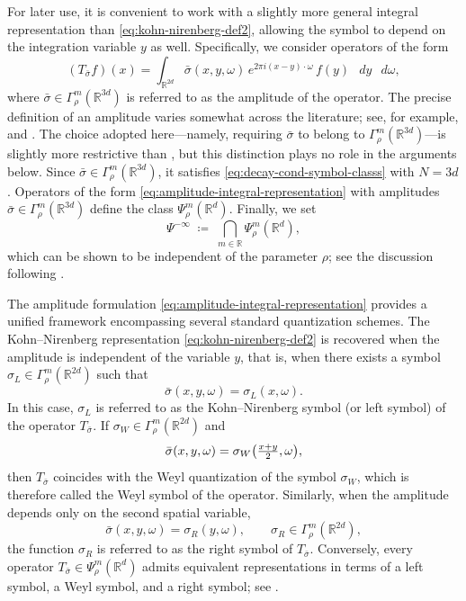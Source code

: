 \documentclass[a4paper,12pt]{article}
\let\originalleft\left
\let\originalright\right
\renewcommand{\left}{\mathopen{}\mathclose\bgroup\originalleft}
\renewcommand{\right}{\aftergroup\egroup\originalright}
\newcommand{\R}{\mathbb{R}}
\newcommand{\diff}{\mathop{}\!d}
\newcommand{\psidosymbclass}{\Gamma^m_\rho}
\newcommand{\psidoopclass}{\Psi^m_\rho}
\begin{document}
For later use, it is convenient to work with a slightly more general integral
representation than \eqref{eq:kohn-nirenberg-def2}, allowing the symbol to depend
on the integration variable $y$ as well.
Specifically, we consider operators of the form
\begin{equation}\label{eq:amplitude-integral-representation}
    (T_{\bar\sigma} f)(x)
    =
    \int_{\R^{2d}} \bar\sigma(x,y,\omega)\,
    e^{2\pi i (x-y)\cdot\omega}\,
    f(y)\,\diff y\,\diff\omega,
\end{equation}
where $\bar\sigma\in\psidosymbclass(\R^{3d})$ is referred to as the
amplitude of the operator. The precise definition of an amplitude varies somewhat across the literature;
see, for example, \cite[Definition~23.3]{shubin_pseudodifferential_2001} and
\cite[Definition~2.1]{treves2013psido}.
The choice adopted here—namely, requiring $\bar\sigma$ to belong to
$\psidosymbclass(\R^{3d})$—is slightly more restrictive than
\cite[Definition~23.3]{shubin_pseudodifferential_2001}, but this distinction plays
no role in the arguments below. Since $\bar\sigma\in\psidosymbclass(\R^{3d})$, it satisfies 
\eqref{eq:decay-cond-symbol-classs} with $N=3d$.
Operators of the form \eqref{eq:amplitude-integral-representation} with amplitudes $\bar\sigma\in\psidosymbclass(\R^{3d})$ define the
class $\psidoopclass(\R^d)$.
Finally, we set
\[
\Psi^{-\infty}
\;\coloneqq\;
\bigcap_{m\in\R}\psidoopclass(\R^d),
\]
which can be shown to be independent of the parameter $\rho$; see the discussion following
\cite[Definition~23.4]{shubin_pseudodifferential_2001}.

The amplitude formulation \eqref{eq:amplitude-integral-representation} provides a
unified framework encompassing several standard quantization schemes.
The Kohn--Nirenberg representation \eqref{eq:kohn-nirenberg-def2} is recovered when
the amplitude is independent of the variable \(y\), that is, when there exists a
symbol \(\sigma_L\in\Gamma_\rho^m(\R^{2d})\) such that
\[
\bar\sigma(x,y,\omega)=\sigma_L(x,\omega).
\]
In this case, \(\sigma_L\) is referred to as the Kohn--Nirenberg symbol (or
left symbol) of the operator \(T_{\bar\sigma}\).
If \(\sigma_W\in\Gamma_\rho^m(\R^{2d})\) and
\[
\bar\sigma(x,y,\omega)=\sigma_W \left(\tfrac{x+y}{2},\omega\right),
\]
then \(T_{\bar\sigma}\) coincides with the Weyl quantization of the symbol
\(\sigma_W\), which is therefore called the Weyl symbol of the operator.
Similarly, when the amplitude depends only on the second spatial variable,
\[
\bar\sigma(x,y,\omega)=\sigma_R(y,\omega),
\qquad \sigma_R\in\Gamma_\rho^m(\R^{2d}),
\]
the function \(\sigma_R\) is referred to as the right symbol of
\(T_{\bar\sigma}\).
Conversely, every operator \(T_{\bar\sigma}\in\Psi_\rho^m(\R^d)\) admits equivalent
representations in terms of a left symbol, a Weyl symbol, and a right symbol; see
\cite[Theorem~23.1]{shubin_pseudodifferential_2001}.
\end{document}
